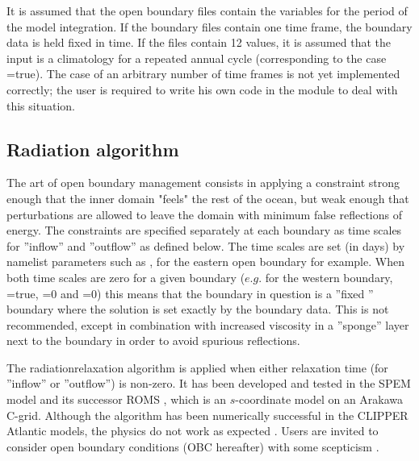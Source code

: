 It is assumed that the open boundary files contain the variables for the period of 
the model integration. If the boundary files contain one time frame, the boundary 
data is held fixed in time. If the files contain 12 values, it is assumed that the input 
is a climatology for a repeated annual cycle (corresponding to the case  
=true). The case of an arbitrary number of time frames is not yet implemented 
correctly; the user is required to write his own code in the module  
to deal with this situation. 

\subsection{Radiation algorithm}
\label{OBC_rad}

The art of open boundary management consists in applying a constraint strong 
enough that the inner domain "feels" the rest of the ocean, but weak enough
that perturbations are allowed to leave the domain with minimum false reflections 
of energy. The constraints are specified separately at each boundary as time 
scales for ''inflow'' and ''outflow'' as defined below. The time scales are set (in days) 
by namelist parameters such as ,  for the eastern open 
boundary for example. When both time scales are zero for a given boundary 
($e.g.$ for the western boundary, =true, =0 and 
=0) this means that the boundary in question is a ''fixed '' boundary 
where the solution is set exactly by the boundary data. This is not recommended, 
except in combination with increased viscosity in a ''sponge'' layer next to the 
boundary in order to avoid spurious reflections.  


The radiation\/relaxation  
algorithm is applied when either relaxation time (for ''inflow'' or ''outflow'') is 
non-zero. It has been developed and tested in the SPEM model and its 
successor ROMS \citep{Barnier1996, Marchesiello2001}, which is an 
$s$-coordinate model on an Arakawa C-grid. Although the algorithm has 
been numerically successful in the CLIPPER Atlantic models, the physics 
do not work as expected \citep{Treguier_al_JGR01}. Users are invited to consider 
open boundary conditions (OBC hereafter) with some scepticism 
\citep{Durran2001, Blayo2005}.

